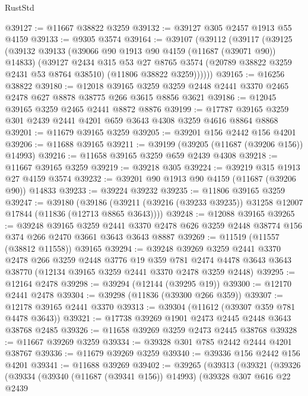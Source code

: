 \begin{lexlean}{RustStd}
\begin{coremodule}
@39127 := @11667 @38822 @3259
@39132 := @39127 @305 @2457 @1913 @55 @4159
@39133 := @9305 @3574
@39164 := @39107
    (@39112
      (@39117
        (@39125
          (@39132
            @39133
            (@39066 @90 @1913 @90 @4159 (@11687 (@39071 @90)) @14833)
            (@39127
              @2434
              @315
              @53
              @27
              @8765
              @3574
              (@20789 @38822 @3259 @2431 @53 @8764 @38510)
              (@11806 @38822 @3259))))))
@39165 := @16256 @38822
@39180 := @12018
    @39165
    @3259
    @3259
    @2448
    @2441
    @3370
    @2465
    @2478
    @627
    @8878
    @38775
    @266
    @3615
    @8856
    @3621
@39186 := @12045 @39165 @3259 @2465 @2441 @8872 @8876
@39199 := @17787 @39165 @3259 @301 @2439 @2441 @4201 @659 @3643 @4308 @3259 @4616 @8864 @8868
@39201 := @11679 @39165 @3259
@39205 := @39201 @156 @2442 @156 @4201
@39206 := @11688 @39165
@39211 := @39199 (@39205 (@11687 (@39206 @156)) @14993)
@39216 := @11658 @39165 @3259 @659 @2439 @4308
@39218 := @11667 @39165 @3259
@39219 := @39218 @305
@39224 := @39219 @315 @1913 @27 @4159 @3574
@39232 := @39201 @90 @1913 @90 @4159 (@11687 (@39206 @90)) @14833
@39233 := @39224 @39232
@39235 := @11806 @39165 @3259
@39247 := @39180
    (@39186 (@39211 (@39216 (@39233 @39235)) @31258 @12007 @17844 (@11836 (@12713 @8865 @3643))))
@39248 := @12088 @39165
@39265 := @39248
    @39165
    @3259
    @2441
    @3370
    @2478
    @626
    @3259
    @2448
    @38774
    @156
    @374
    @266
    @2470
    @3661
    @3643
    @3643
    @8887
@39269 := @11519 (@11557 (@38812 @11558)) @39165
@39294 := @39248
    @39269
    @3259
    @2441
    @3370
    @2478
    @266
    @3259
    @2448
    @3776
    @19
    @359
    @781
    @2474
    @4478
    @3643
    @3643
    @38770
    (@12134 @39165 @3259 @2441 @3370 @2478 @3259 @2448)
@39295 := @12164 @2478
@39298 := @39294 (@12144 (@39295 @19))
@39300 := @12170 @2441 @2478
@39304 := @39298 (@11836 (@39300 @266 @359))
@39307 := @12178 @39165 @2441 @3370
@39313 := @39304 (@11612 (@39307 @359 @781 @4478 @3643))
@39321 := @17738 @39269 @1901 @2473 @2445 @2448 @3643 @38768 @2485
@39326 := @11658 @39269 @3259 @2473 @2445 @38768
@39328 := @11667 @39269 @3259
@39334 := @39328 @301 @785 @2442 @2444 @4201 @38767
@39336 := @11679 @39269 @3259
@39340 := @39336 @156 @2442 @156 @4201
@39341 := @11688 @39269
@39402 := @39265
    (@39313
      (@39321
        (@39326
          (@39334
            (@39340 (@11687 (@39341 @156)) @14993)
            (@39328
              @307
              @616
              @22
              @2439

\end{coremodule}
\end{lexlean}
